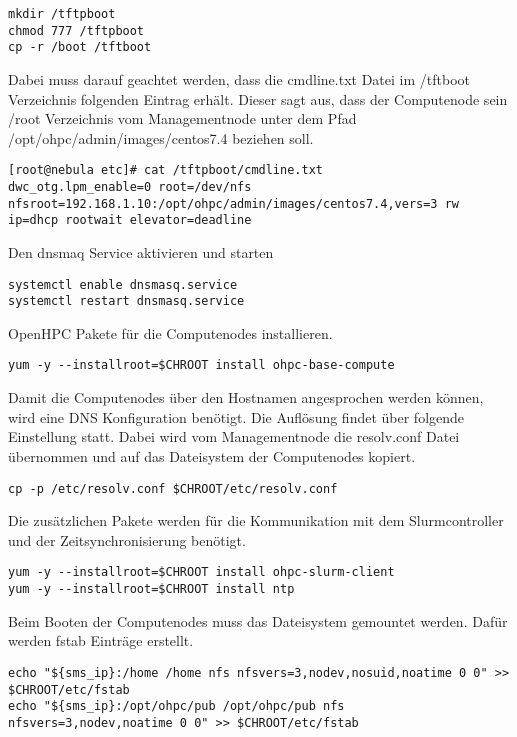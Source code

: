 \begin{lstlisting}
mkdir /tftpboot
chmod 777 /tftpboot
cp -r /boot /tftboot
\end{lstlisting}

Dabei muss darauf geachtet werden, dass die cmdline.txt Datei im /tftboot Verzeichnis folgenden Eintrag erhält. Dieser sagt aus, dass der Computenode sein /root Verzeichnis vom Managementnode unter dem Pfad /opt/ohpc/admin/images/centos7.4 beziehen soll.

\begin{lstlisting}
[root@nebula etc]# cat /tftpboot/cmdline.txt
dwc_otg.lpm_enable=0 root=/dev/nfs nfsroot=192.168.1.10:/opt/ohpc/admin/images/centos7.4,vers=3 rw ip=dhcp rootwait elevator=deadline
\end{lstlisting}


Den dnsmaq Service aktivieren und starten
\begin{lstlisting}
systemctl enable dnsmasq.service
systemctl restart dnsmasq.service
\end{lstlisting}

OpenHPC Pakete für die Computenodes installieren.
\begin{lstlisting}
yum -y --installroot=$CHROOT install ohpc-base-compute
\end{lstlisting}

Damit die Computenodes über den Hostnamen angesprochen werden können, wird eine DNS Konfiguration benötigt. Die Auflösung findet über folgende Einstellung statt. Dabei wird vom Managementnode die resolv.conf Datei übernommen und auf das Dateisystem der Computenodes kopiert.
\begin{lstlisting}
cp -p /etc/resolv.conf $CHROOT/etc/resolv.conf
\end{lstlisting}

Die zusätzlichen Pakete werden für die Kommunikation mit dem Slurmcontroller und der Zeitsynchronisierung benötigt.

\begin{lstlisting}
yum -y --installroot=$CHROOT install ohpc-slurm-client
yum -y --installroot=$CHROOT install ntp
\end{lstlisting}

Beim Booten der Computenodes muss das Dateisystem gemountet werden. Dafür werden fstab Einträge erstellt. 

\begin{lstlisting}
echo "${sms_ip}:/home /home nfs nfsvers=3,nodev,nosuid,noatime 0 0" >> $CHROOT/etc/fstab
echo "${sms_ip}:/opt/ohpc/pub /opt/ohpc/pub nfs nfsvers=3,nodev,noatime 0 0" >> $CHROOT/etc/fstab
\end{lstlisting}

